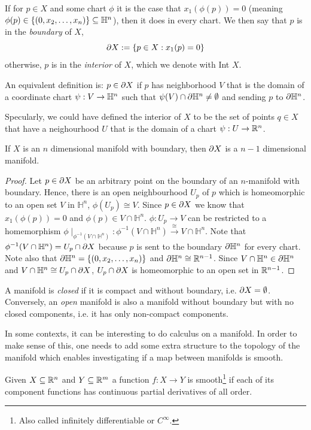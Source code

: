 \begin{defn}
    If for $p \in X$ and some chart $\phi$ it is the case that $x_1(\phi (p) )= 0$ (meaning $\phi (p) \in \{(0,x_2, \dots, x_n)\}\subseteq \mathbb{H}^n$), then it does in every chart. We then say that $p$ is in the \textit{boundary} of $X$, 
    $$
        \partial X := \{ p \in X : x_1(p) = 0\}
    $$
    otherwise, $p$ is in the \textit{interior} of $X$, which we denote with Int $X$. 

    \noindent An equivalent definition is: $p \in \partial X$ if $p$ has neighborhood $V$ that is the domain of a coordinate chart $\psi:V\to\mathbb{H}^n$ such that $\psi(V)\cap\partial\mathbb{H}^n\neq\emptyset$ and sending $p$ to $\partial \mathbb{H}^n$.

    \noindent Specularly, we could have defined the interior of $X$ to be the set of points $q\in X$ that have a neighourhood $U$ that is the domain of a chart $\psi:U\to\mathbb{R}^n$.
\end{defn}
\begin{lem}
    If $X$ is an $n$ dimensional manifold with boundary, then $\partial X$ is a $n-1$ dimensional manifold.
\end{lem}
\begin{proof}
    Let $p\in\partial X$ be an arbitrary point on the boundary of an $n$-manifold with boundary. Hence, there is an open neighbourhood $U_p$ of $p$ which is homeomorphic to an open set $V$ in $\mathbb{H}^n$, $ \phi(U_p)\cong V$. Since $p\in\partial X$ we know that $x_1(\phi(p))=0$ and $\phi(p)\in V\cap\mathbb{H}^n$. $\phi:U_p\to V$ can be restricted to a homemorphism $\phi\mid_{\phi^{-1}(V\cap\mathbb{H}^n)}:\phi^{-1}(V\cap\mathbb{H}^n)\xrightarrow{\cong}V\cap\mathbb{H}^n$. Note that $\phi^{-1}(V\cap\mathbb{H}^n)=U_p\cap\partial X$ because $p$ is sent to the boundary $\partial\mathbb{H}^n$ for every chart. Note also that $\partial\mathbb{H}^n=\{(0,x_2, \dots, x_n)\}$ and $\partial\mathbb{H}^n\cong\mathbb{R}^{n-1}$. Since $V\cap\mathbb{H}^n\in\partial\mathbb{H}^n$ and $V\cap\mathbb{H}^n\cong U_p\cap\partial X$, $U_p\cap\partial X$ is homeomorphic to an open set in $\mathbb{R}^{n-1}$.
\end{proof}
\begin{defn}
    A manifold is \textit{closed} if it is compact and without boundary, i.e. $\partial X = \emptyset$. Conversely, an \textit{open} manifold is also a manifold without boundary but with no closed components, i.e. it has only non-compact components. 
\end{defn}

In some contexts, it can be interesting to do calculus on a manifold. In order to make sense of this, one needs to add some extra structure to the topology of the manifold which enables investigating if a map between manifolds is smooth.
\begin{defn}
    Given $X\subseteq\mathbb{R}^n$ and $Y\subseteq\mathbb{R}^m$ a function $f:X\to Y$ is smooth\footnote{Also called infinitely differentiable or $C^\infty$.} if each of its component functions has continuous partial derivatives of all order.
\end{defn}

